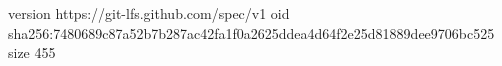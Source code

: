 version https://git-lfs.github.com/spec/v1
oid sha256:7480689c87a52b7b287ac42fa1f0a2625ddea4d64f2e25d81889dee9706bc525
size 455
